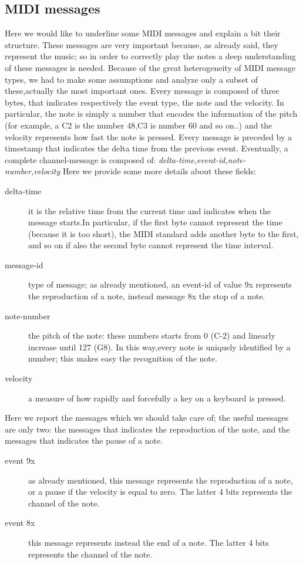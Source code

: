 \documentclass[12pt]{article}
\begin{document}
\subsection{MIDI messages}
Here we would like to underline some MIDI messages and explain a bit their structure. These messages are very important because, as already said, they represent the music; so in order to correctly play the notes a deep understanding of these messages is needed.\newline
Because of the great heterogeneity of MIDI message types, we had to make some assumptions and analyze only a subset of these,actually the most important ones. Every message is composed of three bytes, that indicates respectively the event type, the note and the velocity. In particular, the note is simply a number that encodes the information of the pitch (for example, a C2 is the number 48,C3 is number 60 and so on..) and the velocity represents how fast the note is pressed. 
Every message is preceded by a timestamp that indicates the delta time from the previous event.\newline
Eventually, a complete channel-message is composed of: \newline
\emph{delta-time,event-id,note-number,velocity} \newline
Here we provide some more details about these fields:\newline
\begin{description}
	\item[delta-time] it is the relative time from the current time and indicates when the message starts.In particular, if the first byte cannot represent the time (because it is too short), the MIDI standard adds another byte to the first, and so on if also the second byte cannot represent the time interval.
	\item[message-id] type of message; as already mentioned, an event-id of value 9x represents the reproduction of a note, instead message 8x the stop of a note.
	\item[note-number] the pitch of the note: these numbers starts from 0 (C-2) and linearly increase until 127 (G8). In this way,every note is uniquely identified by a number; this makes easy the recognition of the note.
	\item[velocity] a measure of how rapidly and forcefully a key on a keyboard is pressed.
\end{description}
Here we report the messages which we should take care of; the useful messages are only two: the messages that indicates the reproduction of the note, and the messages that indicates the pause of a note.
\begin{description} 
	\item[event 9x]  as already mentioned, this message represents the reproduction of a note, or a pause if the velocity is equal to zero. The latter 4 bits represents the channel of the note.
	\item[event 8x] this message represents instead the end of a note. The latter 4 bits represents the channel of the note.
\end{description}
\end{document}
